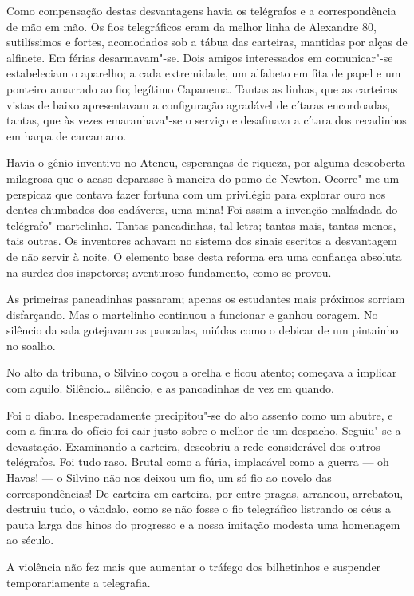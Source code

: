 Como compensação destas desvantagens havia os telégrafos e a correspondência
de mão em mão. Os fios telegráficos eram da melhor linha de Alexandre
80, sutilíssimos e fortes, acomodados sob a tábua das carteiras,
mantidas por alças de alfinete. Em férias desarmavam"-se. Dois amigos
interessados em comunicar"-se estabeleciam o aparelho; a cada
extremidade, um alfabeto em fita de papel e um ponteiro amarrado ao
fio; legítimo Capanema. Tantas as linhas, que as carteiras vistas de
baixo apresentavam a configuração agradável de cítaras encordoadas,
tantas, que às vezes emaranhava"-se o serviço e desafinava a cítara
dos recadinhos em harpa de carcamano. 

Havia o gênio inventivo no
Ateneu, esperanças de riqueza, por alguma descoberta milagrosa que o
acaso deparasse à maneira do pomo de Newton. Ocorre"-me um perspicaz
que contava fazer fortuna com um privilégio para explorar ouro nos
dentes chumbados dos cadáveres, uma mina! Foi assim a invenção
malfadada do telégrafo"-martelinho. Tantas pancadinhas, tal letra;
tantas mais, tantas menos, tais outras. Os inventores achavam no
sistema dos sinais escritos a desvantagem de não servir à noite. O
elemento base desta reforma era uma confiança absoluta na surdez dos
inspetores; aventuroso fundamento, como se provou. 

As primeiras
pancadinhas passaram; apenas os estudantes mais próximos sorriam
disfarçando. Mas o martelinho continuou a funcionar e ganhou coragem.
No silêncio da sala gotejavam as pancadas, miúdas como o debicar de um
pintainho no soalho. 

No alto da tribuna, o Silvino coçou a orelha e
ficou atento; começava a implicar com aquilo.
Silêncio\ldots{} silêncio, e as pancadinhas de vez em quando. 

Foi o diabo.
Inesperadamente precipitou"-se do alto assento como um abutre, e com a
finura do ofício foi cair justo sobre o melhor de um despacho.
Seguiu"-se a devastação. Examinando a carteira, descobriu a rede
considerável dos outros telégrafos. Foi tudo raso. Brutal como a fúria,
implacável como a guerra --- oh Havas! --- o Silvino não nos deixou um
fio, um só fio ao novelo das correspondências! De carteira em carteira,
por entre pragas, arrancou, arrebatou, destruiu tudo, o vândalo, como
se não fosse o fio telegráfico listrando os céus a pauta larga dos
hinos do progresso e a nossa imitação modesta uma homenagem ao século.

A violência não fez mais que aumentar o tráfego dos bilhetinhos e
suspender temporariamente a telegrafia. 

